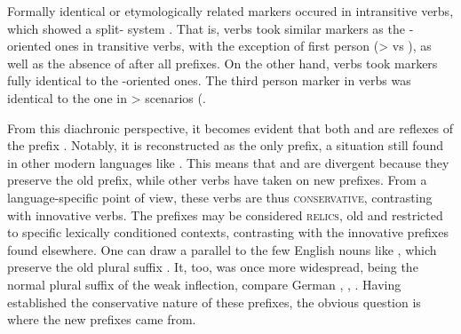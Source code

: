 

Formally identical or etymologically related markers occured in intransitive verbs, which showed a split- system .
That is,  verbs took similar markers as the -oriented ones in transitive verbs, with the exception of first person (>  vs  ), as well as the absence of  after all  prefixes.
On the other hand,  verbs took markers fully identical to the -oriented ones.
The third person marker in  verbs was identical to the one in > scenarios (.

From this diachronic perspective, it becomes evident that both \hixka {} and \trio {} are reflexes of the \PC {} prefix .
Notably, it is reconstructed as the only  prefix, a situation still found in other modern languages like \maqui {}.
This means that \hixka {} and \trio {} are divergent because they preserve the old prefix, while other verbs have taken on new prefixes.
From a language-specific point of view, these verbs are thus \textsc{conservative}, contrasting with innovative verbs.
The prefixes may be considered \textsc{relics}, old and restricted to specific lexically conditioned contexts, contrasting with the innovative prefixes found elsewhere.
One can draw a parallel to the few English nouns like , which preserve the old plural suffix .
It, too, was once more widespread, being the normal plural suffix of the weak inflection, compare German , , .
Having established the conservative nature of these prefixes, the obvious question is where the new prefixes came from.



